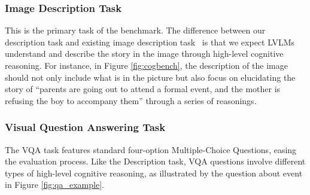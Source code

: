 \subsubsection{Image Description Task}
This is the primary task of the benchmark.
The difference between our description task and existing image description task~\cite{xie2022visual, zhu2023chatgpt, zhuge2023mindstorms} is that we expect LVLMs understand and describe the story in the image through high-level cognitive reasoning. 
For instance, in Figure \ref{fig:cogbench}, the description of the image should not only include what is in the picture but also focus on elucidating the story of ``parents are going out to attend a formal event, and the mother is refusing the boy to accompany them'' through a series of reasonings.





\subsubsection{Visual Question Answering Task}


The VQA task features standard four-option Multiple-Choice Questions, easing the evaluation process. Like the Description task, VQA questions involve different types of high-level cognitive reasoning, as illustrated by the question about event in Figure \ref{fig:qa_example}. 


